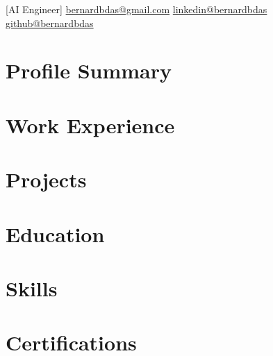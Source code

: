 \documentclass{main}
\begin{document}
[AI Engineer]{%
  \contactline%
  {\href{mailto:bernardbdas@gmail.com}{bernardbdas@gmail.com}}%
  {\href{https://linkedin.com/in/bernardbdas}{linkedin@bernardbdas}}%
  {\href{https://github.com/bernardbdas}{github@bernardbdas}}%
}


\begin{minipage}[t]{0.65\textwidth}

  \section{Profile Summary}
  
  \sectionsep

  \section{Work Experience}
  
  \sectionsep

  \section{Projects}
  
  \sectionsep

  \section{Education}
  

\end{minipage}%
\hfill
\begin{minipage}[t]{0.32\textwidth}

  \section{Skills}
  
  \sectionsep

  \section{Certifications}
  

\end{minipage}
\end{document}
